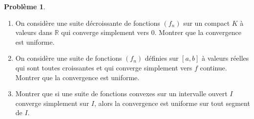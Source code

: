 \documentclass[french]{book}
\newcommand{\R}{\mathbb{R}}
\theoremstyle{definition}
\newtheorem{pro}{Problème}[chapter]
\theoremstyle{remark}
\begin{document}
\begin{pro}
	\begin{enumerate}
		\item On considère une suite décroissante de fonctions $(f_n)$ sur un compact $K$ à valeurs dans $\R$ qui converge simplement vers $0$. Montrer que la convergence est uniforme.
		\item On considère une suite de fonctions $(f_n)$ définies sur $[a,b]$ à valeurs réelles qui sont toutes croissantes et qui converge simplement vers $f$ continue. Montrer que la convergence est uniforme.
		\item Montrer que si une suite de fonctions convexes sur un intervalle ouvert $I$ converge simplement sur $I$, alors la convergence est uniforme sur tout segment de $I$.
	\end{enumerate}
\end{pro}
\end{document}
